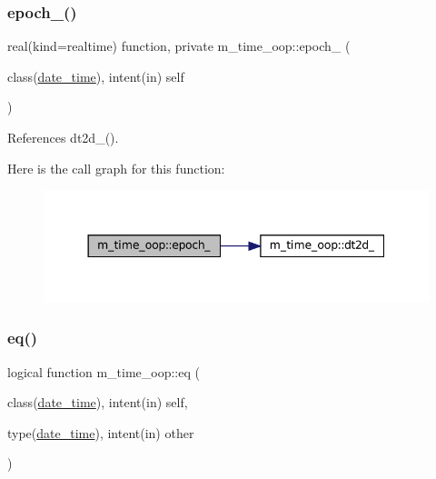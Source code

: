 \subsubsection{\texorpdfstring{epoch\+\_\+()}{epoch\_()}}
{\footnotesize\ttfamily real(kind=realtime) function, private m\+\_\+time\+\_\+oop\+::epoch\+\_\+ (\begin{DoxyParamCaption}\item[{class(\mbox{\hyperlink{structm__time__oop_1_1date__time}{date\+\_\+time}}), intent(in)}]{self }\end{DoxyParamCaption})\hspace{0.3cm}{\ttfamily [private]}}



References dt2d\+\_\+().

Here is the call graph for this function\+:\nopagebreak
\begin{figure}[H]
\begin{center}
\leavevmode
\includegraphics[width=344pt]{namespacem__time__oop_ab4cc90bb587c2d3c2819bffc8f92cb59_cgraph}
\end{center}
\end{figure}
\mbox{\label{namespacem__time__oop_afcc34853af3eda020eb5ff802e04964d}} 
\subsubsection{\texorpdfstring{eq()}{eq()}}
{\footnotesize\ttfamily logical function m\+\_\+time\+\_\+oop\+::eq (\begin{DoxyParamCaption}\item[{class(\mbox{\hyperlink{structm__time__oop_1_1date__time}{date\+\_\+time}}), intent(in)}]{self,  }\item[{type(\mbox{\hyperlink{structm__time__oop_1_1date__time}{date\+\_\+time}}), intent(in)}]{other }\end{DoxyParamCaption})\hspace{0.3cm}{\ttfamily [private]}}



